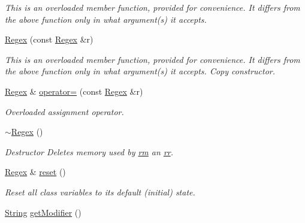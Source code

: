 \begin{DoxyCompactItemize}
\begin{DoxyCompactList}\small\item\em This is an overloaded member function, provided for convenience. It differs from the above function only in what argument(s) it accepts. \end{DoxyCompactList}\item 
\hyperlink{classjpcre2_1_1Regex_ae03bb99a5bc8f945e693ddc34706f0c0_ae03bb99a5bc8f945e693ddc34706f0c0}{Regex} (const \hyperlink{classjpcre2_1_1Regex}{Regex} \&r)
\begin{DoxyCompactList}\small\item\em This is an overloaded member function, provided for convenience. It differs from the above function only in what argument(s) it accepts. Copy constructor. \end{DoxyCompactList}\item 
\hyperlink{classjpcre2_1_1Regex}{Regex} \& \hyperlink{classjpcre2_1_1Regex_ab43a14b4b6e75b7fa3221bc18a1d4121_ab43a14b4b6e75b7fa3221bc18a1d4121}{operator=} (const \hyperlink{classjpcre2_1_1Regex}{Regex} \&r)
\begin{DoxyCompactList}\small\item\em Overloaded assignment operator. \end{DoxyCompactList}\item 
\hypertarget{classjpcre2_1_1Regex_a12b2bf254b59d7967681b77795c49260}{}\label{classjpcre2_1_1Regex_a12b2bf254b59d7967681b77795c49260} 
\hyperlink{classjpcre2_1_1Regex_a12b2bf254b59d7967681b77795c49260}{$\sim$\+Regex} ()
\begin{DoxyCompactList}\small\item\em Destructor Deletes memory used by \hyperlink{classjpcre2_1_1Regex_a447925705d222dbbd8c7d60b98cc65f0}{rm} an \hyperlink{classjpcre2_1_1Regex_a5a7ac6c6288988079b8933b4b6637fab}{rr}. \end{DoxyCompactList}\item 
\hyperlink{classjpcre2_1_1Regex}{Regex} \& \hyperlink{classjpcre2_1_1Regex_a91f6afe257e9633cbb79a98649ab8d02_a91f6afe257e9633cbb79a98649ab8d02}{reset} ()
\begin{DoxyCompactList}\small\item\em Reset all class variables to its default (initial) state. \end{DoxyCompactList}\item 
\hyperlink{namespacejpcre2_a91f03070152fb228bc116c5a737f1d16}{String} \hyperlink{classjpcre2_1_1Regex_a0ac4e063f00128b96cd94c33609dc559_a0ac4e063f00128b96cd94c33609dc559}{get\+Modifier} ()

\end{DoxyCompactItemize}
